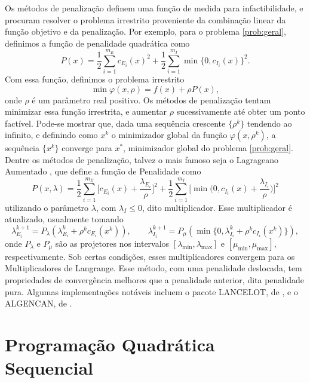 Os métodos de penalização definem uma função de medida para infactibilidade, e
procuram resolver o problema irrestrito proveniente da combinação linear da
função objetivo e da penalização.  
Por exemplo, para o problema \eqref{prob:geral}, definimos a função de
penalidade quadrática como
$$ P(x) = \frac{1}{2}\sum_{i=1}^{m_E}c_{E_i}(x)^2 +
\frac{1}{2}\sum_{i=1}^{m_I}\min\{0,c_{I_i}(x)\}^2.$$
Com essa função, definimos o problema irrestrito
\begin{equation*}
  \min \varphi(x,\rho) = f(x) + \rho P(x),
\end{equation*}
onde $\rho$ é um parâmetro real positivo.
Os métodos de penalização tentam minimizar essa função irrestrita, e aumentar
$\rho$ sucessivamente até obter um ponto factível. 
Pode-se mostrar que, dada uma sequência crescente $\{\rho^k\}$ tendendo ao
infinito, e definindo como $x^k$ o minimizador global da função
$\varphi(x,\rho^k)$, a sequência $\{x^k\}$ converge para $x^*$,
minimizador global do problema \eqref{prob:geral}.
Dentre os métodos de penalização, talvez o mais famoso seja o Lagrageano
Aumentado \cite{bib:lagraum}, que define a função de Penalidade como 
\begin{equation*}
  P(x,\lambda) = \frac{1}{2} \sum_{i=1}^{m_E}\bigg[
  c_{E_i}(x)+\frac{\lambda_{E_i}}{\rho}\bigg]^2 +
  \frac{1}{2}\sum_{i=1}^{m_I}\bigg[\min\bigg(0, c_{I_i}(x) +
  \frac{\lambda_{I_i}}{\rho}\bigg)\bigg]^2
\end{equation*}
utilizando o parâmetro $\lambda$, com $\lambda_I\leq 0$, dito multiplicador.
Esse multiplicador é atualizado, usualmente tomando
$$ \lambda_{E_i}^{k+1} = P_{\lambda}(\lambda_{E_i}^k + \rho^k c_{E_i}(x^k)), \qquad 
\lambda_{I_i}^{k+1} = P_{\mu}(\min\{0, \lambda_{I_i}^k + \rho^k c_{I_i}(x^k)\}), $$
onde $P_\lambda$ e $P_\mu$ são as projetores nos intervalos
$[\lambda_\min,\lambda_\max]$ e $[\mu_\min,\mu_\max]$, respectivamente.
Sob certas condições, esses multiplicadores convergem para os Multiplicadores de
Langrange.
Esse método, com uma penalidade deslocada, tem propriedades de convergência
melhores que a penalidade anterior, dita penalidade pura. Algumas implementações
notáveis incluem o pacote LANCELOT, de \citet{bib:lancelot}, e o ALGENCAN, de
\citet{bib:algencan1, bib:algencan2}.

\section{Programação Quadrática Sequencial}


